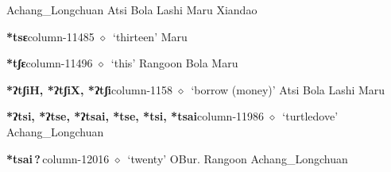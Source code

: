 \hspace{1ex}
         Achang\_Longchuan 
\hspace{1ex}
         Atsi 
\hspace{1ex}
         Bola 
\hspace{1ex}
         Lashi 
\hspace{1ex}
         Maru 
\hspace{1ex}
         Xiandao 
  \item {\footnotesize \textbf{*tsɛ}}{\tiny column-11485}
         $\diamond$~`thirteen'
         Maru 
  \item {\footnotesize \textbf{*tʃɛ}}{\tiny column-11496}
         $\diamond$~`this'
         Rangoon 
\hspace{1ex}
         Bola 
\hspace{1ex}
         Maru 
  \item {\footnotesize \textbf{*ʔtʃiH, *ʔtʃiX, *ʔtʃi}}{\tiny column-1158}
         $\diamond$~`borrow (money)'
         Atsi 
\hspace{1ex}
         Bola 
\hspace{1ex}
         Lashi 
\hspace{1ex}
         Maru 
  \item {\footnotesize \textbf{*ʔtsi, *ʔtse, *ʔtsai, *tse, *tsi, *tsai}}{\tiny column-11986}
         $\diamond$~`turtledove'
         Achang\_Longchuan 
  \item {\footnotesize \textbf{*tsai\,?\,}}{\tiny column-12016}
         $\diamond$~`twenty'
         OBur. 
\hspace{1ex}
         Rangoon 
\hspace{1ex}
         Achang\_Longchuan 
